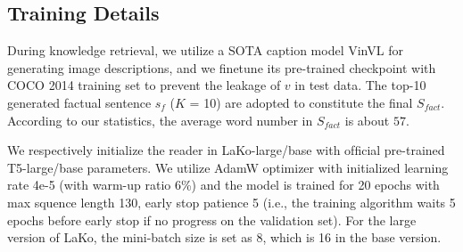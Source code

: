 \documentclass[sigconf]{acmart}
\newcommand{\cjy}[1]{{\color{black}#1}}
\begin{document}
\subsection{Training Details}
During knowledge retrieval, we utilize a SOTA caption model VinVL \citep{DBLP:conf/cvpr/ZhangLHY0WCG21} for \cjy{generating image descriptions, and we finetune its pre-trained checkpoint with COCO 2014 training set to prevent the leakage of $v$ in test data.
The top-10 generated factual sentence $s_f$ ($K$ = 10) are adopted to constitute the final $S_{fact}$.}
According to our statistics, the average word number in $S_{fact}$ is about $57$.

We respectively initialize the reader in LaKo-large/base with ofﬁcial pre-trained T5-large/base parameters.
We utilize AdamW optimizer with initialized learning rate 4e-5 (with warm-up ratio 6\%) and the model is trained for 20 epochs with max squence length 130, early stop patience 5 (i.e., the training algorithm waits 5 epochs before early stop if no progress on the validation set).
For the large version of LaKo, the mini-batch size is set as 8, which is 16 in the base version.
\end{document}
